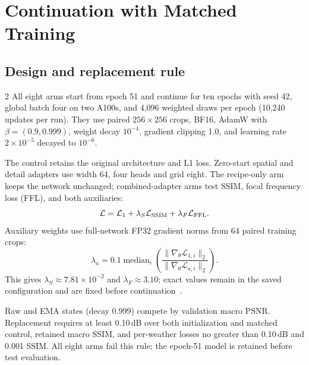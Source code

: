 \section{Continuation with Matched Training}
\label{sec:jointresults}
\subsection{Design and replacement rule}
\label{sec:jointmethod}
\begin{multicols}{2}\raggedcolumns
All eight arms start from epoch 51 and continue for ten epochs with seed 42,
global batch four on two A100s, and 4,096 weighted draws per epoch
(10,240 updates per run). They use paired $256\times256$ crops, BF16,
AdamW with $\beta=(0.9,0.999)$, weight decay $10^{-4}$, gradient clipping 1.0,
and learning rate $2\times10^{-5}$ decayed to $10^{-6}$.

The control retains the original architecture and L1 loss. Zero-start spatial
and detail adapters use width 64, four heads and grid eight. The recipe-only
arm keeps the network unchanged; combined-adapter arms test SSIM, focal
frequency loss (FFL), and both auxiliaries:
\begin{equation}
\mathcal L=\mathcal L_1+\lambda_S\mathcal L_{\rm SSIM}
+\lambda_F\mathcal L_{\rm FFL}.
\end{equation}
Auxiliary weights use full-network FP32 gradient norms from 64 paired
training crops:
\begin{equation}
\lambda_a=0.1\operatorname{median}_i\left(
\frac{\|\nabla_\theta\mathcal L_{1,i}\|_2}{\|\nabla_\theta\mathcal L_{a,i}\|_2}\right).
\end{equation}
This gives $\lambda_S\approx7.81\times10^{-2}$ and $\lambda_F\approx3.10$;
exact values remain in the saved configuration and are fixed before
continuation~\cite{Jiang_2021_FFL}.

Raw and EMA states (decay 0.999) compete by validation macro PSNR. Replacement
requires at least 0.10\,dB over both initialization and matched control,
retained macro SSIM, and per-weather losses no greater than 0.10\,dB and
0.001 SSIM. All eight arms fail this rule; the epoch-51 model is retained
before test evaluation.
\end{multicols}
\clearpage
\noindent\begin{minipage}{\linewidth}
\centering{}
\label{fig:joint}
\end{minipage}
